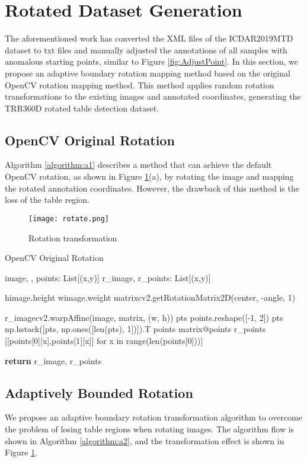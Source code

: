 \documentclass{article}
\begin{document}
\section{Rotated Dataset Generation}




The aforementioned work has converted the XML files of the ICDAR2019MTD dataset to txt files and manually adjusted the annotations of all samples with anomalous starting points, similar to Figure \ref{fig:AdjustPoint}. In this section, we propose an adaptive boundary rotation mapping method based on the original OpenCV rotation mapping method. This method applies random rotation transformations to the existing images and annotated coordinates, generating the TRR360D rotated table detection dataset.

\subsection{OpenCV Original Rotation}

Algorithm \ref{algorithm:a1} describes a method that can achieve the default OpenCV rotation, as shown in  Figure \ref{fig:Rotate}(a), by rotating the image and mapping the rotated annotation coordinates. However, the drawback of this method is the loss of the table region.


\begin{figure}
    \centering
    \texttt{[image: rotate.png]}
    \caption{Rotation transformation}
    \label{fig:Rotate}
\end{figure}

\begin{algorithm}
\caption{OpenCV Original Rotation}
\begin{algorithmic}[1]
\Require image, , points: List[(x,y)]
\Ensure r\_image, r\_points: List[(x,y)]

\State himage.height
\State wimage.weight
\State matrixcv2.getRotationMatrix2D(center, -angle, 1)

\State r_imagecv2.warpAffine(image, matrix, (w, h))
\State pts  points.reshape([-1, 2])
\State pts  np.hstack([pts, np.ones([len(pts), 1])]).T
\State points  matrix@points
\State r_points  [[points[0][x],points[1][x]] for x in range(len(points[0]))]


\State \textbf{return} r\_image, r\_points
\end{algorithmic}
\label{algorithm:a1}
\end{algorithm}

\subsection{Adaptively Bounded Rotation}
We propose an adaptive boundary rotation transformation algorithm to overcome the problem of losing table regions when rotating images. The algorithm flow is shown in Algorithm \ref{algorithm:a2}, and the transformation effect is shown in Figure \ref{fig:Rotate}.
\end{document}

